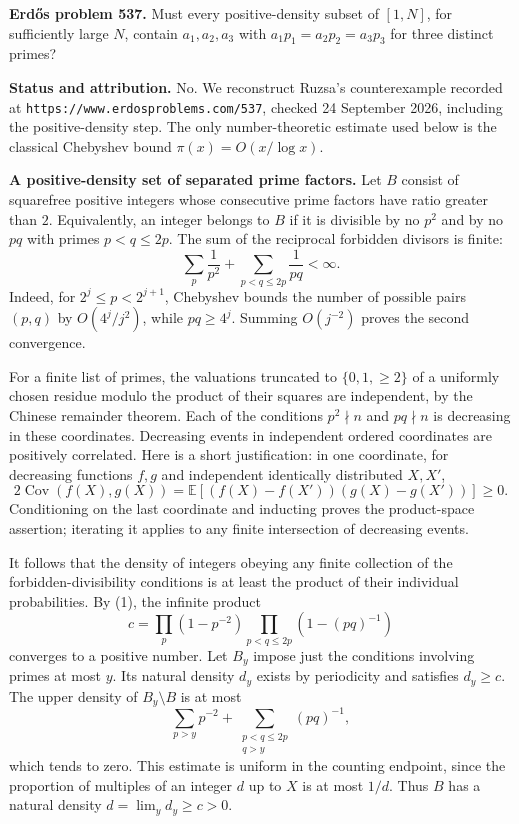 \textbf{Erd\H{o}s problem 537.}
Must every positive-density subset of $[1,N]$, for sufficiently large $N$, contain $a_1,a_2,a_3$ with $a_1p_1=a_2p_2=a_3p_3$ for three distinct primes?

\textbf{Status and attribution.}
No. We reconstruct Ruzsa's counterexample recorded at
\texttt{https://www.erdosproblems.com/537}, checked 24 September 2026, including the positive-density step. The only number-theoretic estimate used below is the classical Chebyshev bound $\pi(x)=O(x/\log x)$.

\textbf{A positive-density set of separated prime factors.}
Let $B$ consist of squarefree positive integers whose consecutive prime factors have ratio greater than $2$. Equivalently, an integer belongs to $B$ if it is divisible by no $p^2$ and by no $pq$ with primes $p<q\leq2p$.
The sum of the reciprocal forbidden divisors is finite:
\[
 \sum_p\frac1{p^2}+\sum_{p<q\leq2p}\frac1{pq}<\infty.       \tag{1}
\]
Indeed, for $2^j\leq p<2^{j+1}$, Chebyshev bounds the number of possible pairs $(p,q)$ by $O(4^j/j^2)$, while $pq\geq4^j$. Summing $O(j^{-2})$ proves the second convergence.

For a finite list of primes, the valuations truncated to $\{0,1,\geq2\}$ of a uniformly chosen residue modulo the product of their squares are independent, by the Chinese remainder theorem. Each of the conditions $p^2\nmid n$ and $pq\nmid n$ is decreasing in these coordinates. Decreasing events in independent ordered coordinates are positively correlated. Here is a short justification: in one coordinate, for decreasing functions $f,g$ and independent identically distributed $X,X'$,
\[
 2\operatorname{Cov}(f(X),g(X))
 =\mathbb E[(f(X)-f(X'))(g(X)-g(X'))]\geq0.
\]
Conditioning on the last coordinate and inducting proves the product-space assertion; iterating it applies to any finite intersection of decreasing events.

It follows that the density of integers obeying any finite collection of the forbidden-divisibility conditions is at least the product of their individual probabilities. By (1), the infinite product
\[
 c=\prod_p(1-p^{-2})
       \prod_{p<q\leq2p}(1-(pq)^{-1})
\]
converges to a positive number.
Let $B_y$ impose just the conditions involving primes at most $y$. Its natural density $d_y$ exists by periodicity and satisfies $d_y\geq c$. The upper density of $B_y\setminus B$ is at most
\[
 \sum_{p>y}p^{-2}
 +\sum_{\substack{p<q\leq2p\\q>y}}(pq)^{-1},
\]
which tends to zero. This estimate is uniform in the counting endpoint, since the proportion of multiples of an integer $d$ up to $X$ is at most $1/d$. Thus $B$ has a natural density $d=\lim_y d_y\geq c>0$.

